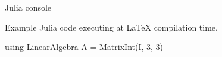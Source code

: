 \begin{frame}[fragile]{Julia console}

Example Julia code executing at LaTeX compilation time. %

\phantom{}

\begin{juliaconsole}
using LinearAlgebra
A = Matrix{Int}(I, 3, 3)
\end{juliaconsole}

\end{frame}